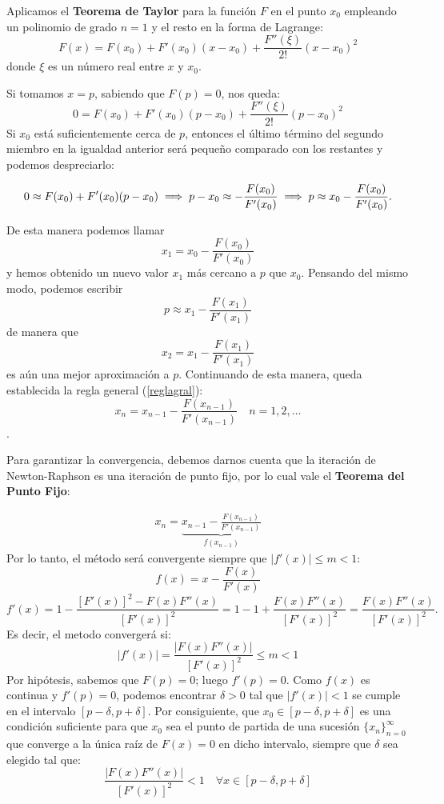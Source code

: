 \documentclass[openany]{book}
\begin{document}
Aplicamos el \textbf{Teorema de Taylor} para la función \(F\) en el punto \(x_0\) empleando un polinomio de grado \(n=1\) y el resto en la forma de Lagrange:
\[F(x) = F(x_0) + F'(x_0)(x-x_0) + \frac{F''(\xi)}{2!}(x-x_0)^2\]
donde \(\xi\) es un número real entre \(x\) y \(x_0\).

Si tomamos \(x = p\), sabiendo que \(F(p) = 0\), nos queda:
\[0 = F(x_0) + F'(x_0)(p-x_0) + \frac{F''(\xi)}{2!}(p-x_0)^2\]
Si \(x_0\) está suficientemente cerca de \(p\), entonces el último término del segundo miembro en la igualdad anterior será pequeño comparado con los restantes y podemos despreciarlo:

\begin{equation}
0 \approx F(x_0) + F'(x_0)(p-x_0) \implies p-x_0 \approx - \frac{F(x_0)}{F'(x_0)}\\
\implies p \approx x_0 - \frac{F(x_0)}{F'(x_0)}.
\label{eq:relacion}
\end{equation}

De esta manera podemos llamar \[x_1 = x_0 - \frac{F(x_0)}{F'(x_0)}\] y hemos obtenido un nuevo valor \(x_1\) más cercano a \(p\) que \(x_0\). Pensando del mismo modo, podemos escribir \[p \approx x_1 - \frac{F(x_1)}{F'(x_1)}\] de manera que \[x_2 = x_1 - \frac{F(x_1)}{F'(x_1)}\] es aún una mejor aproximación a \(p\). Continuando de esta manera, queda establecida la regla general (\ref{reglagral}): \[x_n = x_{n-1} - \frac{F(x_{n-1})}{F'(x_{n-1})} \quad n=1,2,\dots\].

Para garantizar la convergencia, debemos darnos cuenta que la iteración de Newton-Raphson es una iteración de punto fijo, por lo cual vale el \textbf{Teorema del Punto Fijo}:

\begin{gather*}
x_n = 
\underbrace{x_{n-1} - \frac{F(x_{n-1})}{F'(x_{n-1})}}_{f(x_{n-1})} 
\end{gather*}
Por lo tanto, el método será convergente siempre que \(|f'(x)| \leq m < 1\):
\[f(x) = x - \frac{F(x)}{F'(x)}\]
\[f'(x) = 1 - \frac{[F'(x)]^2 - F(x)F''(x)}{[F'(x)]^2} = 1 - 1 + \frac{F(x)F''(x)}{[F'(x)]^2} = \frac{F(x)F''(x)}{[F'(x)]^2}.\]
Es decir, el metodo convergerá si:
\[|f'(x)| = \frac{|F(x)F''(x)|}{[F'(x)]^2} \leq m < 1\]
Por hipótesis, sabemos que \(F(p) = 0\); luego \(f'(p) = 0\). Como \(f(x)\) es continua y \(f'(p) = 0\), podemos encontrar \(\delta > 0\) tal que \(|f'(x)| < 1\) se cumple en el intervalo \([p - \delta, p + \delta]\). Por consiguiente, que \(x_0 \in [p - \delta, p + \delta]\) es una condición suficiente para que \(x_0\) sea el punto de partida de una sucesión \(\{x_n\}_{n=0}^{\infty}\) que converge a la única raíz de \(F(x) = 0\) en dicho intervalo, siempre que \(\delta\) sea elegido tal que:
\[\frac{|F(x)F''(x)|}{[F'(x)]^2} < 1  \quad \forall x \in [p - \delta, p + \delta]\]
\end{document}
